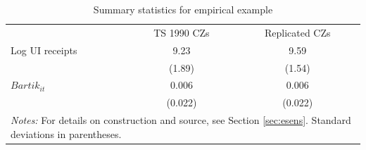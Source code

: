 \begin{table}
\caption{Summary statistics for empirical example}
\begin{tabular}{lcc}
\hline\hline 
	& TS 1990 CZs & Replicated CZs \\
Log UI receipts & 9.23     &  9.59   	\\
				& (1.89)	&  (1.54)	\\
$Bartik_{it}$	& 0.006		&	0.006		\\
				& (0.022)		&	(0.022)		\\
                \hline	
\multicolumn{3}{p{4in}}{\footnotesize \textit{Notes:} For details on construction and source, see Section \ref{sec:esens}. Standard deviations in parentheses.} \\
\hline\hline
\end{tabular}                
\end{table}

